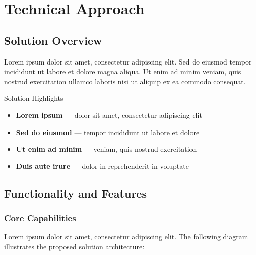 \section{\texorpdfstring{\color{MidnightBlue}Technical Approach}{Technical Approach}}

\subsection{Solution Overview}

Lorem ipsum dolor sit amet, consectetur adipiscing elit. Sed do eiusmod tempor incididunt ut labore et dolore magna aliqua. Ut enim ad minim veniam, quis nostrud exercitation ullamco laboris nisi ut aliquip ex ea commodo consequat.

\begin{sidebar}{Solution Highlights}
\begin{itemize}
    \item \textbf{Lorem ipsum} --- dolor sit amet, consectetur adipiscing elit
    \item \textbf{Sed do eiusmod} --- tempor incididunt ut labore et dolore
    \item \textbf{Ut enim ad minim} --- veniam, quis nostrud exercitation
    \item \textbf{Duis aute irure} --- dolor in reprehenderit in voluptate
\end{itemize}
\end{sidebar}

\subsection{Functionality and Features}

\subsubsection{Core Capabilities}

Lorem ipsum dolor sit amet, consectetur adipiscing elit. The following diagram illustrates the proposed solution architecture:

